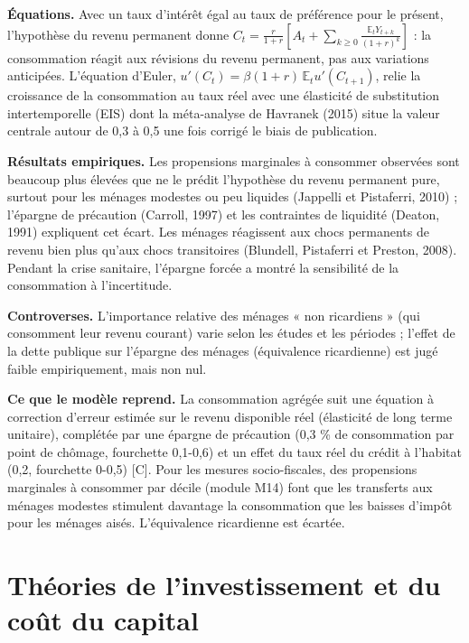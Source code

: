 \documentclass[
  11pt,
  11pt,
  a4paper,
  openany]{book}
\begin{document}
\textbf{Équations.} Avec un taux d'intérêt égal au taux de préférence
pour le présent, l'hypothèse du revenu permanent donne
\(C_t = \frac{r}{1+r}\left[A_t + \sum_{k \ge 0} \frac{\mathbb{E}_t Y_{t+k}}{(1+r)^k}\right]\)
: la consommation réagit aux révisions du revenu permanent, pas aux
variations anticipées. L'équation d'Euler,
\(u'(C_t) = \beta(1+r)\,\mathbb{E}_t u'(C_{t+1})\), relie la croissance
de la consommation au taux réel avec une élasticité de substitution
intertemporelle (EIS) dont la méta-analyse de Havranek (2015) situe la
valeur centrale autour de 0,3 à 0,5 une fois corrigé le biais de
publication.

\textbf{Résultats empiriques.} Les propensions marginales à consommer
observées sont beaucoup plus élevées que ne le prédit l'hypothèse du
revenu permanent pure, surtout pour les ménages modestes ou peu liquides
(Jappelli et Pistaferri, 2010) ; l'épargne de précaution (Carroll, 1997)
et les contraintes de liquidité (Deaton, 1991) expliquent cet écart. Les
ménages réagissent aux chocs permanents de revenu bien plus qu'aux chocs
transitoires (Blundell, Pistaferri et Preston, 2008). Pendant la crise
sanitaire, l'épargne forcée a montré la sensibilité de la consommation à
l'incertitude.

\textbf{Controverses.} L'importance relative des ménages « non
ricardiens » (qui consomment leur revenu courant) varie selon les études
et les périodes ; l'effet de la dette publique sur l'épargne des ménages
(équivalence ricardienne) est jugé faible empiriquement, mais non nul.

\textbf{Ce que le modèle reprend.} La consommation agrégée suit une
équation à correction d'erreur estimée sur le revenu disponible réel
(élasticité de long terme unitaire), complétée par une épargne de
précaution (0,3 \% de consommation par point de chômage, fourchette
0,1-0,6) et un effet du taux réel du crédit à l'habitat (0,2, fourchette
0-0,5) {[}C{]}. Pour les mesures socio-fiscales, des propensions
marginales à consommer par décile (module M14) font que les transferts
aux ménages modestes stimulent davantage la consommation que les baisses
d'impôt pour les ménages aisés. L'équivalence ricardienne est écartée.

\hypertarget{sec:investissement}{%
\section{Théories de l'investissement et du coût du
capital}\label{sec:investissement}}
\end{document}
